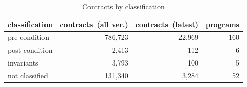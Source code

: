 \begin{table}[]
\centering
\caption{Contracts by classification}
\label{tab:contractsbyclassification}
\begin{tabular}{|p{2.1cm}|r|r|r|} \hline
   classification & \parbox{1.2cm}{contracts\ (all ver.)} & \parbox{1.2cm}{contracts\ (latest)} & programs \\ \hline
	pre-condition &  786,723 & 
22,969 & 
160 \\ 
	post-condition &  2,413 & 
112 & 
6 \\ 
	invariants &  3,793 & 
100 & 
5 \\ 
	not classified &  131,340 & 
3,284 & 
52 \\ 
\hline
\end{tabular}
\end{table}
